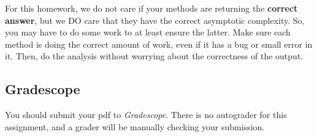 \documentclass[paper=a4, fontsize=11pt, parskip=full]{scrartcl} %
\numberwithin{equation}{section} %
\numberwithin{figure}{section} %
\numberwithin{table}{section} %
\begin{document}
For this homework, we do not care if your methods are returning the \textbf{correct answer}, but we DO care that they have the correct asymptotic complexity. So, you may have to do some work to at least ensure the latter. Make sure each method is doing the correct amount of work, even if it has a bug or small error in it. Then, do the analysis without worrying about the correctness of the output.


\subsection{Gradescope}

You should submit your pdf to \emph{Gradescope}. There is no autograder for this assignment, and a grader will be manually checking your submission.


\end{document}
